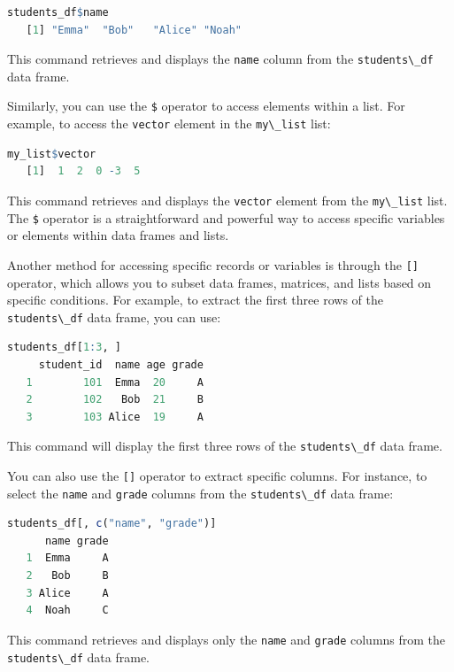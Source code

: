 \documentclass[
]{book}
\newcommand{\passthrough}[1]{#1}
\theoremstyle{definition}
\theoremstyle{definition}
\theoremstyle{definition}
\theoremstyle{definition}
\theoremstyle{remark}
\begin{document}
\begin{lstlisting}[language=R]
students_df$name
   [1] "Emma"  "Bob"   "Alice" "Noah"
\end{lstlisting}

This command retrieves and displays the \passthrough{\lstinline!name!} column from the \passthrough{\lstinline!students\_df!} data frame.

Similarly, you can use the \passthrough{\lstinline!$!} operator to access elements within a list. For example, to access the \passthrough{\lstinline!vector!} element in the \passthrough{\lstinline!my\_list!} list:

\begin{lstlisting}[language=R]
my_list$vector
   [1]  1  2  0 -3  5
\end{lstlisting}

This command retrieves and displays the \passthrough{\lstinline!vector!} element from the \passthrough{\lstinline!my\_list!} list. The \passthrough{\lstinline!$!} operator is a straightforward and powerful way to access specific variables or elements within data frames and lists.

Another method for accessing specific records or variables is through the \passthrough{\lstinline![]!} operator, which allows you to subset data frames, matrices, and lists based on specific conditions. For example, to extract the first three rows of the \passthrough{\lstinline!students\_df!} data frame, you can use:

\begin{lstlisting}[language=R]
students_df[1:3, ]
     student_id  name age grade
   1        101  Emma  20     A
   2        102   Bob  21     B
   3        103 Alice  19     A
\end{lstlisting}

This command will display the first three rows of the \passthrough{\lstinline!students\_df!} data frame.

You can also use the \passthrough{\lstinline![]!} operator to extract specific columns. For instance, to select the \passthrough{\lstinline!name!} and \passthrough{\lstinline!grade!} columns from the \passthrough{\lstinline!students\_df!} data frame:

\begin{lstlisting}[language=R]
students_df[, c("name", "grade")]
      name grade
   1  Emma     A
   2   Bob     B
   3 Alice     A
   4  Noah     C
\end{lstlisting}

This command retrieves and displays only the \passthrough{\lstinline!name!} and \passthrough{\lstinline!grade!} columns from the \passthrough{\lstinline!students\_df!} data frame.
\end{document}
